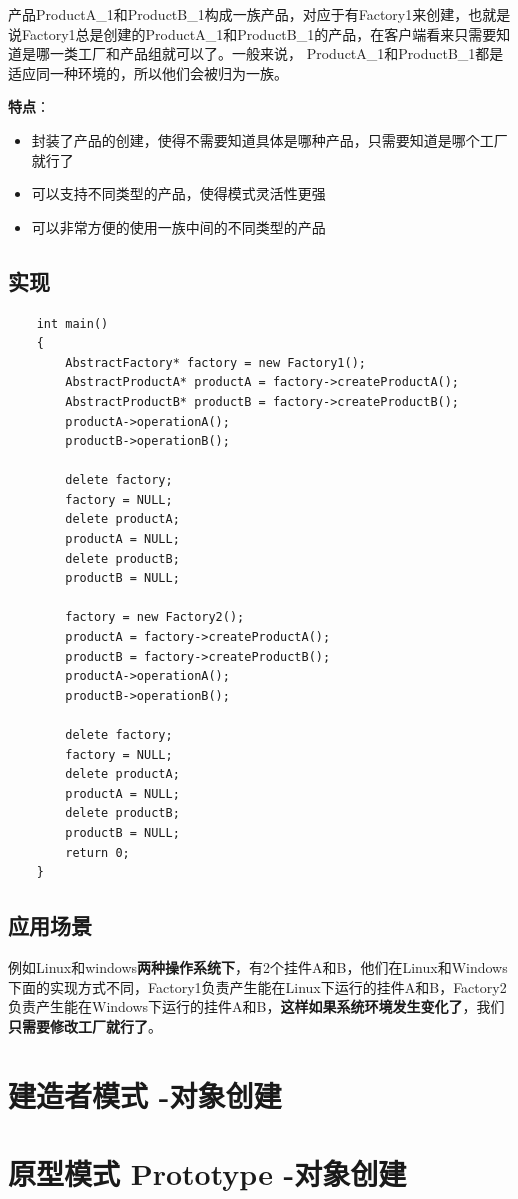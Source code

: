 \documentclass[UTF8,a4paper,12pt]{ctexbook}
\begin{document}
		
		产品ProductA\_1和ProductB\_1构成一族产品，对应于有Factory1来创建，也就是说Factory1总是创建的ProductA\_1和ProductB\_1的产品，在客户端看来只需要知道是哪一类工厂和产品组就可以了。一般来说， ProductA\_1和ProductB\_1都是适应同一种环境的，所以他们会被归为一族。
		
		\textbf{特点}：
		\begin{itemize}
			\item 封装了产品的创建，使得不需要知道具体是哪种产品，只需要知道是哪个工厂就行了
			\item 可以支持不同类型的产品，使得模式灵活性更强
			\item 可以非常方便的使用一族中间的不同类型的产品
		\end{itemize}
	\subsection{实现}
\begin{lstlisting}
	int main()
	{
		AbstractFactory* factory = new Factory1();
		AbstractProductA* productA = factory->createProductA();
		AbstractProductB* productB = factory->createProductB();
		productA->operationA();
		productB->operationB();
		
		delete factory;
		factory = NULL;
		delete productA;
		productA = NULL;
		delete productB;
		productB = NULL;
		
		factory = new Factory2();
		productA = factory->createProductA();
		productB = factory->createProductB();
		productA->operationA();
		productB->operationB();
		
		delete factory;
		factory = NULL;
		delete productA;
		productA = NULL;
		delete productB;
		productB = NULL;
		return 0;
	}
\end{lstlisting}	
	
	
	\subsection{应用场景}
		例如Linux和windows\textbf{两种操作系统下}，有2个挂件A和B，他们在Linux和Windows下面的实现方式不同，Factory1负责产生能在Linux下运行的挂件A和B，Factory2负责产生能在Windows下运行的挂件A和B，\textbf{这样如果系统环境发生变化了}，我们\textbf{只需要修改工厂就行了}。
\newpage
\section{建造者模式 -对象创建}



\newpage
\section{原型模式 Prototype -对象创建}
\end{document}
